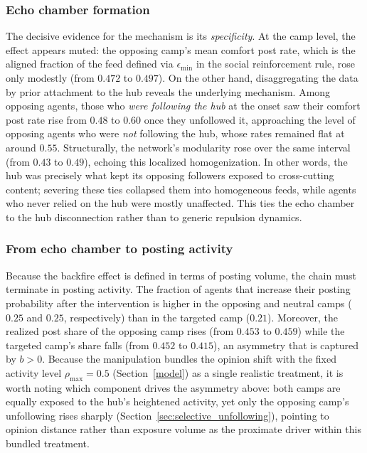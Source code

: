 \documentclass[pdflatex,sn-mathphys-num]{sn-jnl}%
\theoremstyle{thmstyleone}%
\theoremstyle{thmstyletwo}%
\theoremstyle{thmstylethree}%
\begin{document}
\subsubsection{Echo chamber formation}\label{Chain3}
The decisive evidence for the mechanism is its \emph{specificity}.
At the camp level, the effect appears muted: the opposing camp's mean comfort post rate,
which is the aligned fraction of the feed defined via $\epsilon_{\min}$
 in the social reinforcement rule, rose only modestly
 (from $0.472$ to $0.497$). On the other hand, disaggregating the data by prior
attachment to the hub reveals the underlying mechanism. Among opposing agents, those who
\emph{were following the hub} at the onset saw their comfort post rate rise from $0.48$ to $0.60$ once they unfollowed it, approaching the level of opposing agents who were
\emph{not} following the hub, whose rates remained flat at around $0.55$.
Structurally, the network's modularity rose over the same interval
(from $0.43$ to $0.49$), echoing this localized homogenization. In other words, the hub was precisely
what kept its opposing followers exposed to cross-cutting content; severing these ties
collapsed them into homogeneous feeds, while agents who never relied on the hub were
mostly unaffected. This ties the echo chamber to the hub disconnection rather than to
generic repulsion dynamics.
\par

\subsubsection{From echo chamber to posting activity}
Because the backfire effect is defined in terms of posting volume, the chain must terminate in posting activity.
The fraction of agents that increase their posting probability after the
intervention is higher in the opposing and neutral camps ($0.25$ and $0.25$, respectively) than
in the targeted camp ($0.21$). Moreover, the realized post share of the opposing camp
rises (from $0.453$ to $0.459$) while the targeted camp's share falls
(from $0.452$ to $0.415$), an asymmetry that is captured by $b > 0$.
Because the manipulation bundles the opinion shift with the fixed activity
level $\rho_{\max}=0.5$ (Section~\ref{model}) as a single realistic treatment,
it is worth noting which component drives the asymmetry above: both camps are
equally exposed to the hub's heightened activity, yet only the opposing
camp's unfollowing rises sharply (Section~\ref{sec:selective_unfollowing}),
pointing to opinion distance rather than exposure volume as the proximate
driver within this bundled treatment.
\par
\end{document}
